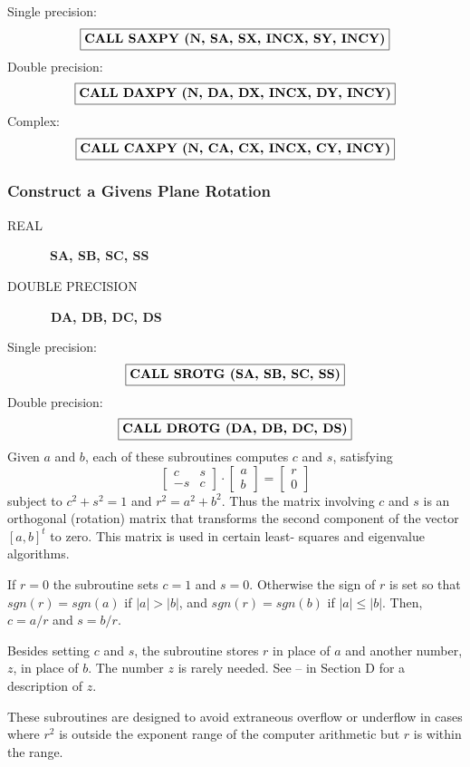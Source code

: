 \documentclass[twoside]{MATH77}
\begin{document}
Single precision:
$$
\fbox{{\bf CALL SAXPY (N, SA, SX, INCX, SY, INCY)}}
$$
Double precision:
$$
\fbox{{\bf CALL DAXPY (N, DA, DX, INCX, DY, INCY)}}
$$
Complex:
$$
\fbox{{\bf CALL CAXPY (N, CA, CX, INCX, CY, INCY)}}
$$
\subsubsection{Construct a Givens Plane Rotation\label{B4}}
\begin{description}
\item[REAL]  \ {\bf SA, SB, SC, SS }

\item[DOUBLE PRECISION]  {\bf \ DA, DB, DC, DS }
\end{description}
Single precision:
$$
\fbox{{\bf CALL SROTG (SA, SB, SC, SS)}}
$$
Double precision:
$$
\fbox{{\bf CALL DROTG (DA, DB, DC, DS)}}
$$
Given $a$ and $b$, each of these subroutines computes $c$ and $s$, satisfying%
\begin{equation*}
\left[
\begin{array}{rr}
c & s \\
-s & c
\end{array}
\right] \cdot \left[
\begin{array}{c}
a \\
b
\end{array}
\right] =\left[
\begin{array}{c}
r \\
0
\end{array}
\right]
\end{equation*}
subject to $c^2+s^2=1$ and $r^2=a^2+b^2$. Thus the matrix involving $c$ and $%
s$ is an orthogonal (rotation) matrix that transforms the second component
of the vector $[a,b]^t$ to zero. This matrix is used in certain least-%
squares and eigenvalue algorithms.

If $r = 0$ the subroutine sets $c = 1$ and $s = 0$. Otherwise the sign of $r$
is set so that $sgn(r) = sgn(a)$ if $|a| > |b|$, and $sgn(r) = sgn(b)$ if $%
|a| \leq |b|$. Then, $c = a/r$ and $s = b/r.$

Besides setting $c$ and $s$, the subroutine stores $r$ in place of $a$ and
another number, $z$, in place of $b$.  The number $z$ is rarely needed.
See
\cite{Lawson:1979:BLA}--\nocite{Lawson:1979:ABL}\nocite{Dodson:1982:RBL}
\cite{Dodson:1983:CRB} in Section D for a description of $z.$

These subroutines are designed to avoid extraneous overflow or underflow in
cases where $r^2$ is outside the exponent range of the computer arithmetic
but $r$ is within the range.
\end{document}
